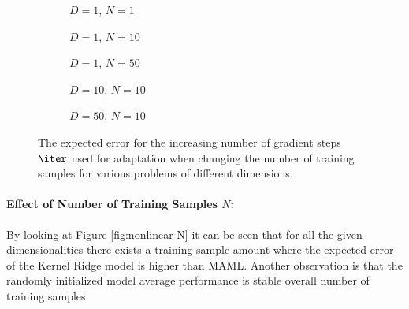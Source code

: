 \begin{figure}[!htb]
  \centering
    \begin{subfigure}{0.32\textwidth}
      \centering
      \caption{$D=1$, $N=1$}
      \label{fig:nonlinear-n_iter-N-1-D-1}
    \end{subfigure}
    \begin{subfigure}{0.32\textwidth}
      \centering
      \caption{$D=1$, $N=10$}
      \label{fig:nonlinear-n_iter-N-10-D-1}
    \end{subfigure}
    \begin{subfigure}{0.32\textwidth}
      \centering
      \caption{$D=1$, $N=50$}
      \label{fig:nonlinear-n_iter-N-50-D-1}
    \end{subfigure}

    \begin{subfigure}{0.32\textwidth}
      \centering
      \caption{$D=10$, $N=10$}
      \label{fig:nonlinear-n_iter-N-10-D-10}
    \end{subfigure}
    \begin{subfigure}{0.32\textwidth}
      \centering
      \caption{$D=50$, $N=10$}
      \label{fig:nonlinear-n_iter-N-10-D-50}
    \end{subfigure}  
  \caption{The expected error for the increasing number of gradient steps $\iter$ used for adaptation when changing the number of training samples for various problems of different dimensions.}
  \label{fig:nonlinear-n_iter}
\end{figure}


\paragraph{Effect of Number of Training Samples $N$:} By looking at Figure \ref{fig:nonlinear-N} it can be seen that for all the given dimensionalities there exists a training sample amount where the expected error of the Kernel Ridge model is higher than MAML. Another observation is that the randomly initialized model average performance is stable overall number of training samples. 

